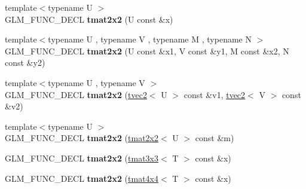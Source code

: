 \begin{DoxyCompactItemize}
\item 
\hypertarget{structglm_1_1detail_1_1tmat2x2_aeb6edeadf2a08e18438d845139c6c0fd}{{\footnotesize template$<$typename U $>$ }\\G\-L\-M\-\_\-\-F\-U\-N\-C\-\_\-\-D\-E\-C\-L {\bfseries tmat2x2} (U const \&x)}\label{structglm_1_1detail_1_1tmat2x2_aeb6edeadf2a08e18438d845139c6c0fd}

\item 
\hypertarget{structglm_1_1detail_1_1tmat2x2_a6d7150d2d56275f0286fe5bdbf57c004}{{\footnotesize template$<$typename U , typename V , typename M , typename N $>$ }\\G\-L\-M\-\_\-\-F\-U\-N\-C\-\_\-\-D\-E\-C\-L {\bfseries tmat2x2} (U const \&x1, V const \&y1, M const \&x2, N const \&y2)}\label{structglm_1_1detail_1_1tmat2x2_a6d7150d2d56275f0286fe5bdbf57c004}

\item 
\hypertarget{structglm_1_1detail_1_1tmat2x2_a050865e2f51e62b964feda65c528dc17}{{\footnotesize template$<$typename U , typename V $>$ }\\G\-L\-M\-\_\-\-F\-U\-N\-C\-\_\-\-D\-E\-C\-L {\bfseries tmat2x2} (\hyperlink{structglm_1_1detail_1_1tvec2}{tvec2}$<$ U $>$ const \&v1, \hyperlink{structglm_1_1detail_1_1tvec2}{tvec2}$<$ V $>$ const \&v2)}\label{structglm_1_1detail_1_1tmat2x2_a050865e2f51e62b964feda65c528dc17}

\item 
\hypertarget{structglm_1_1detail_1_1tmat2x2_a5c569df8414a3a9ce961be72af41369f}{{\footnotesize template$<$typename U $>$ }\\G\-L\-M\-\_\-\-F\-U\-N\-C\-\_\-\-D\-E\-C\-L {\bfseries tmat2x2} (\hyperlink{structglm_1_1detail_1_1tmat2x2}{tmat2x2}$<$ U $>$ const \&m)}\label{structglm_1_1detail_1_1tmat2x2_a5c569df8414a3a9ce961be72af41369f}

\item 
\hypertarget{structglm_1_1detail_1_1tmat2x2_ae1edb9d6f575dae334a56cb4e0bc1d30}{G\-L\-M\-\_\-\-F\-U\-N\-C\-\_\-\-D\-E\-C\-L {\bfseries tmat2x2} (\hyperlink{structglm_1_1detail_1_1tmat3x3}{tmat3x3}$<$ T $>$ const \&x)}\label{structglm_1_1detail_1_1tmat2x2_ae1edb9d6f575dae334a56cb4e0bc1d30}

\item 
\hypertarget{structglm_1_1detail_1_1tmat2x2_a28b0e13e8cb74488c421f5ed8abc22a3}{G\-L\-M\-\_\-\-F\-U\-N\-C\-\_\-\-D\-E\-C\-L {\bfseries tmat2x2} (\hyperlink{structglm_1_1detail_1_1tmat4x4}{tmat4x4}$<$ T $>$ const \&x)}\label{structglm_1_1detail_1_1tmat2x2_a28b0e13e8cb74488c421f5ed8abc22a3}


\end{DoxyCompactItemize}

